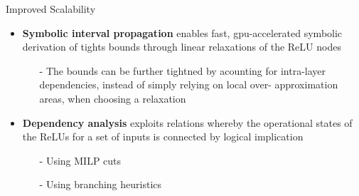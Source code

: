\documentclass[10pt]{beamer}
\begin{document}
\begin{frame}{Improved Scalability}

\begin{itemize} \itemsep 2em


\item {\bf Symbolic interval propagation} enables fast, gpu-accelerated
    symbolic derivation of tights bounds through linear relaxations of the ReLU
        nodes
    \vspace{1em}
    \begin{itemize} 
    \item[\textcolor{black}{-}] The bounds can be further tightned by acounting
        for intra-layer dependencies, instead of simply relying on local over-
        approximation areas, when choosing a relaxation
\end{itemize}


\item {\bf Dependency analysis} exploits relations whereby the  operational
    states of the ReLUs for a set of inputs is connected by logical implication
    \vspace{1em}
    \begin{itemize} \itemsep 1em
        \item[\textcolor{black}{-}] Using MILP cuts
        \item[\textcolor{black}{-}] Using branching heuristics
    \end{itemize}
\end{itemize}
\end{frame}


\end{document}
